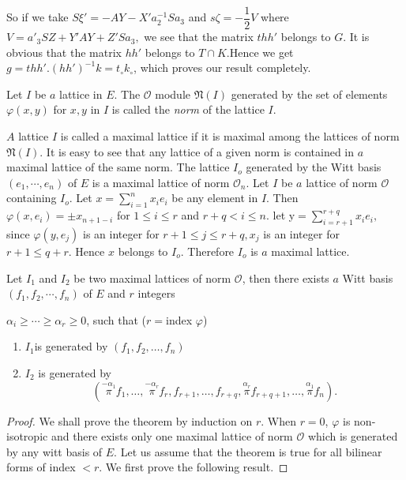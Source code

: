  So if we take $S \xi '= -A Y - X' a_2 ^{-1} S a_3 $ and $s \zeta=
 -\dfrac{1}{2}V $ where $ V= a'_3 S Z + Y' A Y + Z' S a_3, $ we see
 that the matrix $t h h' $ belongs to $G$. It is obvious that the
 matrix $h h'$ belongs to $T \cap K$.Hence we get $ g=t h h'.  (h
 h')^{-1} k = t_\circ k_\circ $, which  proves our result completely. 

 \begin{defi*}
   Let $I$ be $a$ lattice in $E$.  The $\mathscr{O}$ module $
   \mathfrak{N}(I)$  generated by the set of elements $\varphi (x,y)$
   for $x,y$ in $I$ is called the  {\em norm } of the lattice $I$. 
 \end{defi*} 
 
$A$ lattice $I$ is called a maximal lattice if it is maximal among the
 lattices of norm $\mathfrak{N} (I) $. It is easy to see that any
 lattice of a given norm is contained in $a$ maximal lattice of the
 same norm. The lattice $I_o$ generated by the Witt basis $(e_1
, \cdots,  e_n )$ of $E$   is a maximal lattice of norm $\mathscr{O}_n
 $.  Let $I$ be $a$ lattice of norm $\mathscr{O}$ containing
 $I_o$. Let $ x= \sum \limits _{i=1}^n  x_i e_i $ be any element in
 $I$.  Then $ \varphi (x,e_i)= \pm x_{n+1-i}$ for $ 1 \leq i \leq r $
 and $ r + q < i \leq n$. let y$=\sum \limits _{i=r+1}^{r+q} x_i e_i,
 $  since $ \varphi (y,e_j)$ is  an integer for $r+1 \leq j \leq r +q,
 x_j$ is an integer for $ r+1 \leq q +r $.  Hence $x$ belongs to
 $I_o$. Therefore $I_o$ is $a$ maximal lattice.  

\setcounter{theorem}{1}
\begin{theorem}\label{part2:chap2:sec3:thm2}
  Let $I_1$ and $I_2$ be two maximal lattices of norm $\mathscr{O}
  $, then there exists $a$ Witt basis $ (f_1, f_2, \cdots,  f_n)$ of
  $E$  and $r$ integers 

  $\alpha_i \ge \cdots \ge \alpha_r \ge 0$, such that ($r = $index
  $\varphi $) 
  \begin{enumerate}[\rm(1)]
  \item  $I_1$\pageoriginale is generated by $ (f_1, f_2, \ldots, f_n)$
  \item $I_2$ is generated by 
    $$
    \left(\overset{- \alpha_1}{\pi}f_1,\ldots
   ,  \overset{-\alpha_r}{\pi}f_r, f_{r+1 },  \ldots,  f_{r+q},
    \overset{\alpha_r}{\pi} f_{r+q+1}, \ldots,
    \overset{\alpha_1}{\pi}f_n\right).
    $$
  \end{enumerate}
\end{theorem}

\begin{proof}
  We shall prove the theorem by induction on $r$. When
  $r=0$, $\varphi$ is non-isotropic and there exists only one maximal
  lattice of norm $ \mathscr{O}$ which is generated by any witt basis
  of $E$.  Let us assume that the theorem is true for all bilinear
  forms of index $< r$. We first prove the following result. 
\end{proof}

